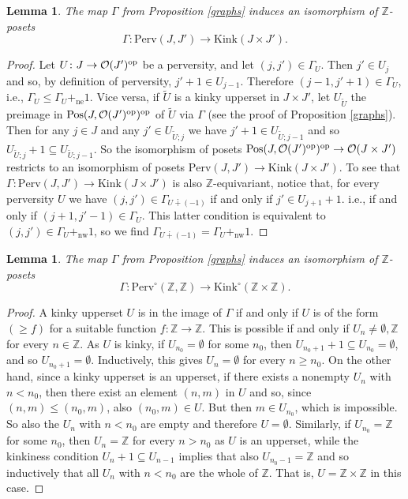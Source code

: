 \documentclass{article}
\newtheorem{lem}[thm]{Lemma}
\theoremstyle{definition}
\newcommand{\Z}{\mathbb{Z}}
\newcommand{\Oo}{\mathcal{O}}
\newcommand{\pos}{\textnormal{Pos}}
\newcommand{\op}{\textnormal{op}}
\newcommand{\gr}{\Gamma}
\begin{document}
\begin{lem}
 The map $\Gamma$ from Proposition \ref{graphs} induces an isomorphism of $\Z$-posets
  \[
 \gr \colon \mathrm{Perv}(J,J')\to \mathrm{Kink}(J\times J').
  \]
\end{lem}
\begin{proof}
Let $U\colon J\to \Oo(J')^\op$ be a perversity, and let $(j,j')\in \Gamma_U$. Then $j'\in U_{j}$ and so, by definition of perversity, $j'+1\in U_{j-1}$. Therefore $(j-1,j'+1)\in \Gamma_U$, i.e., $\Gamma_U\leq \Gamma_U+_{\mathrm{ne}} 1$. Vice versa, if $\tilde{U}$ is a kinky upperset in $J\times J'$, let $U_{\tilde{U}}$ the preimage in $\pos(J,\Oo(J')^\op)^\op$ of $\tilde{U}$ via $\Gamma$ (see the proof of Proposition \ref{graphs}). Then for any $j\in J$ and any $j'\in U_{\tilde{U};j}$ we have $j'+1\in U_{\tilde{U};j-1}$ and so $U_{\tilde{U};j}+1\subseteq U_{\tilde{U};j-1}$. So the isomorphism of posets $\pos(J,\Oo(J')^\op)^\op\to \Oo(J \times J')$ restricts to an isomorphism of posets $\mathrm{Perv}(J,J')\to \mathrm{Kink}(J\times J')$. To see that $ \gr \colon \mathrm{Perv}(J,J')\to \mathrm{Kink}(J\times J')$ is also $\Z$-equivariant, notice that, for every perversity $U$ we have $(j,j')\in \Gamma_{U\dotplus (-1)}$ if and only if $j'\in U_{j+1}+1$. i.e., if and only if $(j+1,j'-1)\in \Gamma_U$. This latter condition is equivalent to $(j,j')\in \Gamma_U+_{\mathrm{nw}}1$, so we find $\Gamma_{U\dotplus (-1)}=\Gamma_U+_{\mathrm{nw}}1$.
\end{proof}



\begin{lem}
The map $\Gamma$ from Proposition \ref{graphs} induces an isomorphism of $\Z$-posets
  \[
 \gr \colon \mathrm{Perv}^\circ(\Z,\Z)\to \mathrm{Kink}^\circ(\Z\times \Z).
  \]
\end{lem}
\begin{proof}
A kinky upperset $U$ is in the image of $\Gamma$ if and only if $U$ is of the form $(\geq f)$ for a suitable function $f\colon \Z\to \Z$. This is possible if and only if $U_n\neq \emptyset,\Z$ for every $n\in \Z$. As $U$ is kinky, if $U_{n_0}=\emptyset$ for some $n_0$, then $U_{n_0+1}+1\subseteq U_{n_0}=\emptyset$, and so $U_{n_0+1}=\emptyset$. Inductively, this gives $U_n=\emptyset$ for every $n\geq n_0$.  On the other hand, since a kinky upperset is an upperset, if there exists a nonempty $U_n$ with $n<n_0$, then there exist an element $(n,m)$ in $U$ and so, since $(n,m)\leq (n_0,m)$, also $ (n_0,m)\in U$. But then $m\in U_{n_0}$, which is impossible. So also the $U_n$ with $n<n_0$ are empty and therefore $U=\emptyset$. Similarly, if $U_{n_0}=\Z$ for some $n_0$, then $U_n=\Z$ for every $n>n_0$ as $U$ is an upperset, while the kinkiness condition $U_{n}+1\subseteq U_{n-1}$ implies that also $U_{n_0-1}=\Z$ and so inductively that all $U_n$ with $n<n_0$ are the whole of $\Z$. That is, $U=\Z\times\Z$ in this case. 
\end{proof}
\end{document}
